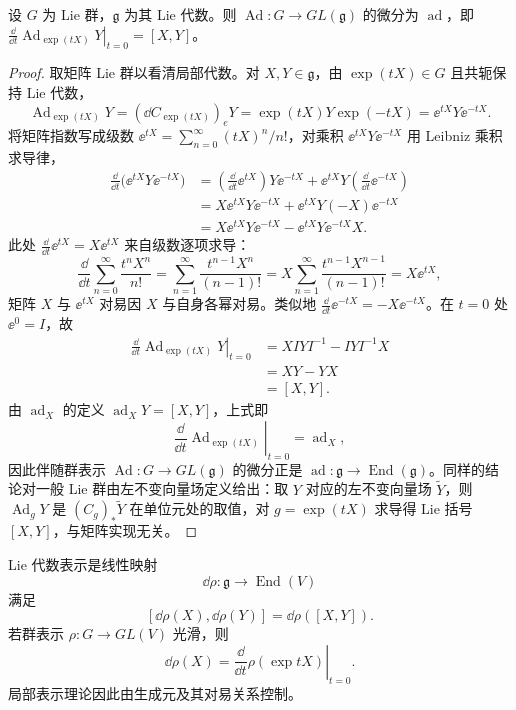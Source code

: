 \begin{proposition}[伴随表示的微分]
设 $G$ 为 Lie 群，$\mathfrak g$ 为其 Lie 代数。则 $\operatorname{Ad}:G\to GL(\mathfrak g)$ 的微分为 $\operatorname{ad}$，即 $\left.\frac{\dd}{\dd t}\operatorname{Ad}_{\exp(tX)}Y\right|_{t=0}=[X,Y]$。
\end{proposition}
\begin{proof}
取矩阵 Lie 群以看清局部代数。对 $X,Y\in\mathfrak g$，由 $\exp(tX)\in G$ 且共轭保持 Lie 代数，
\[
\operatorname{Ad}_{\exp(tX)}Y
=
(\dd C_{\exp(tX)})_eY
=
\exp(tX)Y\exp(-tX)
=
\ee^{tX}Y\ee^{-tX}.
\]
将矩阵指数写成级数 $\ee^{tX}=\sum_{n=0}^\infty(tX)^n/n!$，对乘积 $\ee^{tX}Y\ee^{-tX}$ 用 Leibniz 乘积求导律，
\begin{align*}
\frac{\dd}{\dd t}
\bigl(\ee^{tX}Y\ee^{-tX}\bigr)
&=\left(\frac{\dd}{\dd t}\ee^{tX}\right)Y\ee^{-tX}
+\ee^{tX}Y\left(\frac{\dd}{\dd t}\ee^{-tX}\right)\\
&=X\ee^{tX}Y\ee^{-tX}
+\ee^{tX}Y(-X)\ee^{-tX}\\
&=X\ee^{tX}Y\ee^{-tX}
-\ee^{tX}Y\ee^{-tX}X.
\end{align*}
此处 $\frac{\dd}{\dd t}\ee^{tX}=X\ee^{tX}$ 来自级数逐项求导：
\[
\frac{\dd}{\dd t}\sum_{n=0}^\infty\frac{t^nX^n}{n!}
=\sum_{n=1}^\infty\frac{t^{n-1}X^n}{(n-1)!}
=X\sum_{n=1}^\infty\frac{t^{n-1}X^{n-1}}{(n-1)!}
=X\ee^{tX},
\]
矩阵 $X$ 与 $\ee^{tX}$ 对易因 $X$ 与自身各幂对易。类似地 $\frac{\dd}{\dd t}\ee^{-tX}=-X\ee^{-tX}$。在 $t=0$ 处 $\ee^{0}=I$，故
\begin{align*}
\left.\frac{\dd}{\dd t}
\operatorname{Ad}_{\exp(tX)}Y
\right|_{t=0}
&=XIYI^{-1}-IYI^{-1}X\\
&=XY-YX\\
&=[X,Y].
\end{align*}
由 $\operatorname{ad}_X$ 的定义 $\operatorname{ad}_XY=[X,Y]$，上式即
\[
\left.\frac{\dd}{\dd t}
\operatorname{Ad}_{\exp(tX)}
\right|_{t=0}
=\operatorname{ad}_X,
\]
因此伴随群表示 $\operatorname{Ad}:G\to GL(\mathfrak g)$ 的微分正是 $\operatorname{ad}:\mathfrak g\to\operatorname{End}(\mathfrak g)$。同样的结论对一般 Lie 群由左不变向量场定义给出：取 $Y$ 对应的左不变向量场 $\widetilde Y$，则 $\operatorname{Ad}_gY$ 是 $(C_g)_*\widetilde Y$ 在单位元处的取值，对 $g=\exp(tX)$ 求导得 Lie 括号 $[X,Y]$，与矩阵实现无关。
\end{proof}


Lie 代数表示是线性映射
\[
\dd\rho:\mathfrak g\to\operatorname{End}(V)
\]
满足
\[
[\dd\rho(X),\dd\rho(Y)]
=\dd\rho([X,Y]).
\]
若群表示 $\rho:G\to GL(V)$ 光滑，则
\[
\dd\rho(X)
=\left.\frac{\dd}{\dd t}\rho(\exp tX)\right|_{t=0}.
\]
局部表示理论因此由生成元及其对易关系控制。

